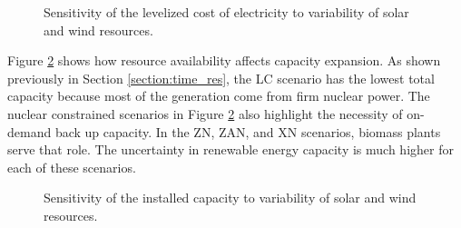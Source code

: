 \begin{figure}[H]
  \centering
  \resizebox{0.95\columnwidth}{!}{}
  \caption{Sensitivity of the levelized cost of electricity to variability of
   solar and wind resources.}
  \label{fig:obj_cost_plot}
\end{figure}

Figure \ref{fig:il_capacity} shows how resource availability affects capacity
expansion. As shown previously in Section \ref{section:time_res}, the LC scenario
has the lowest total capacity because most of the generation come from firm nuclear
power. The nuclear constrained scenarios in Figure \ref{fig:il_capacity} also
highlight the necessity of on-demand back up capacity. In the ZN, ZAN, and XN
scenarios, biomass plants serve that role. The uncertainty in renewable energy
capacity is much higher for each of these scenarios.


\begin{figure}[H]
  \centering
  \resizebox{0.95\columnwidth}{!}{}
  \caption{Sensitivity of the installed capacity to variability of
   solar and wind resources.}
  \label{fig:il_capacity}
\end{figure}
